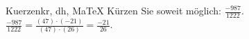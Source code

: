 \begin{MAufgabe}{Kuerzen}{kr, dh, MaTeX}
K\"urzen Sie soweit m\"oglich: $\frac{-987}{1222}$.\\ 
\ifLsg\MLoesung
\quad $\frac{-987}{1222}=\frac{(47)\cdot(-21)}{(47)\cdot(26)}=\frac{-21}{26}$.\else\relax\fi
 \end{MAufgabe}